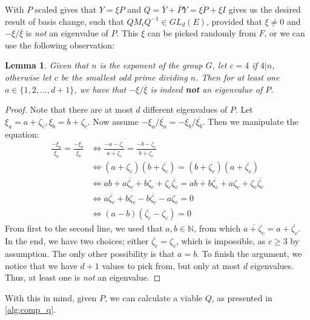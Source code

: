 \documentclass[11pt]{article}
\newtheorem{lemma}[theorem]{Lemma}
\begin{document}
With $P$ scaled \cite[Lemma 3.3]{Pas21} gives that $Y = \xi P$ and $Q = \overline{Y} + \overline{P}Y = \overline{\xi P} + \xi I$
gives us the desired result of basis change, such that $QM_iQ^{-1} \in GL_d(E)$, provided
that $\xi \neq 0$ and $-\xi/\overline{\xi}$ is \textit{not} an eigenvalue of $P$.
This $\xi$ can be picked randomly from $F$, or we can use the following observation:
\begin{lemma}\label{lem:derandomising}
  Given that $n$ is the exponent of the group $G$, let $c = 4$ if $4|n$, otherwise let $c$ be
  the smallest odd prime dividing $n$. Then for at least one $a \in \{1,2,\ldots,d+1\}$, we have
  that $-\xi/\overline{\xi}$ is indeed \textbf{not} an eigenvalue of $P$.
\end{lemma}
\begin{proof}
  Note that there are at most $d$ different eigenvalues of $P$. Let $\xi_a = a + \zeta_c, \xi_b = b + \zeta_c$.
  Now assume $-\xi_a/\overline{\xi_a} = -\xi_b/\overline{\xi_b}$. Then we manipulate the equation:
  \begin{align*}
    \frac{-\xi_a}{\overline{\xi_a}} = \frac{-\xi_b}{\overline{\xi_b}}
    & \Leftrightarrow \frac{-a - \zeta_c}{\overline{a + \zeta_c}} = \frac{-b - \zeta_c}{\overline{b + \zeta_c}} \\
    & \Leftrightarrow (a + \zeta_c)(b + \overline{\zeta_c}) = (b + \zeta_c)(a + \overline{\zeta_c}) \\
    & \Leftrightarrow ab + a\overline{\zeta_c}+b\zeta_c + \zeta_c\overline{\zeta_c} = ab + b\overline{\zeta_c}+a\zeta_c + \zeta_c\overline{\zeta_c} \\
    & \Leftrightarrow a\overline{\zeta_c} + b\zeta_c - b\overline{\zeta_c} - a\zeta_c = 0 \\
    & \Leftrightarrow (a - b)(\overline{\zeta_c} - \zeta_c) = 0
  \end{align*}
  From first to the second line, we used that $a,b\in\mathbb{N}$, from which $\overline{a + \zeta_c} = a + \overline{\zeta_c}$.
  In the end, we have two choices; either $\overline{\zeta_c} = \zeta_c$, which is impossible, as $c \geq 3$ by assumption.
  The only other possibility is that $a=b$. To finish the argument, we notice that we have $d+1$ values to pick from,
  but only at most $d$ eigenvalues. Thus, at least one is \textit{not} an eigenvalue.
\end{proof}
With this in mind, given $P$, we can calculate a viable $Q$, as presented in \cref{alg:comp_q}.
\end{document}
